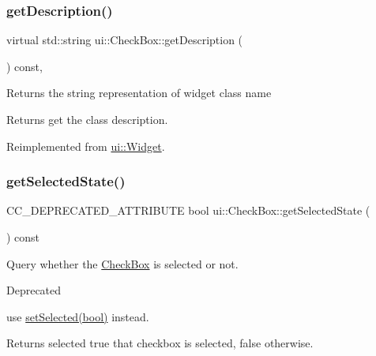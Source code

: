 \subsubsection{\texorpdfstring{get\+Description()}{getDescription()}\hspace{0.1cm}{\footnotesize\ttfamily [2/2]}}
{\footnotesize\ttfamily virtual std\+::string ui\+::\+Check\+Box\+::get\+Description (\begin{DoxyParamCaption}{ }\end{DoxyParamCaption}) const\hspace{0.3cm}{\ttfamily [override]}, {\ttfamily [virtual]}}

Returns the string representation of widget class name \begin{DoxyReturn}{Returns}
get the class description. 
\end{DoxyReturn}


Reimplemented from \hyperlink{classui_1_1Widget_ad85abdaa9133dc6b8efc32670ae9b93f}{ui\+::\+Widget}.

\mbox{\label{classui_1_1CheckBox_ab406d6690121119d07b014c634bf894c}} 
\subsubsection{\texorpdfstring{get\+Selected\+State()}{getSelectedState()}\hspace{0.1cm}{\footnotesize\ttfamily [1/2]}}
{\footnotesize\ttfamily C\+C\+\_\+\+D\+E\+P\+R\+E\+C\+A\+T\+E\+D\+\_\+\+A\+T\+T\+R\+I\+B\+U\+TE bool ui\+::\+Check\+Box\+::get\+Selected\+State (\begin{DoxyParamCaption}{ }\end{DoxyParamCaption}) const\hspace{0.3cm}{\ttfamily [inline]}}

Query whether the \hyperlink{classui_1_1CheckBox}{Check\+Box} is selected or not.

\begin{DoxyRefDesc}{Deprecated}
\item[\hyperlink{deprecated__deprecated000140}{Deprecated}]use {\ttfamily \hyperlink{classui_1_1AbstractCheckButton_aca6eea451771dd184a1cd02984e77cc6}{set\+Selected(bool)}} instead. \end{DoxyRefDesc}
\begin{DoxyReturn}{Returns}
selected true that checkbox is selected, false otherwise. 
\end{DoxyReturn}
\mbox{\label{classui_1_1CheckBox_ab406d6690121119d07b014c634bf894c}} 
